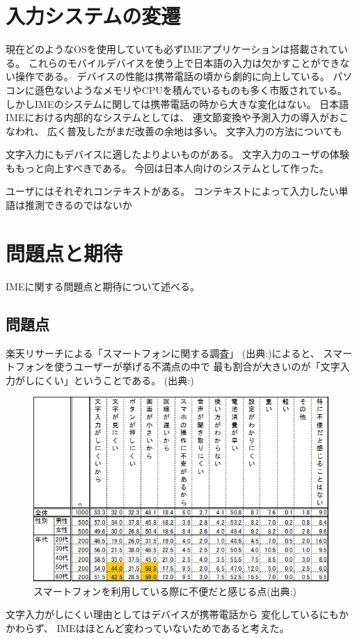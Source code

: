 \section{入力システムの変遷}
現在どのようなOSを使用していても必ずIMEアプリケーションは搭載されている。
これらのモバイルデバイスを使う上で日本語の入力は欠かすことができない操作である。
デバイスの性能は携帯電話の頃から劇的に向上している。
パソコンに遜色ないようなメモリやCPUを積んでいるものも多く市販されている。
しかしIMEのシステムに関しては携帯電話の時から大きな変化はない。
日本語IMEにおける内部的なシステムとしては、
連文節変換や予測入力\cite{pobox}の導入がおこなわれ、
広く普及したがまだ改善の余地は多い。
文字入力の方法についても

文字入力にもデバイスに適したよりよいものがある。
文字入力のユーザの体験ももっと向上すべきである。
今回は日本人向けのシステムとして作った。

ユーザにはそれぞれコンテキストがある。
コンテキストによって入力したい単語は推測できるのではないか

\section{問題点と期待}
IMEに関する問題点と期待について述べる。

\subsection{問題点}
楽天リサーチによる「スマートフォンに関する調査」
(出典:\cite{rakutensmartphone})によると、
スマートフォンを使うユーザーが挙げる不満点の中で
最も割合が大きいのが「文字入力がしにくい」ということである。
(出典:\cite{rakutensmartphone})
\begin{figure}[htbp]
  \begin{center}
    \includegraphics[width=140mm,bb=0 0 589 368]{images/dissatisfaction.png}
    \caption{スマートフォンを利用している際に不便だと感じる点(出典:\cite{rakutensmartphone})}
    \label{fig:dissatisfaction}
  \end{center}
\end{figure}
文字入力がしにくい理由としてはデバイスが携帯電話から
変化しているにもかかわらず、
IMEはほとんど変わっていないためであると考えた。



